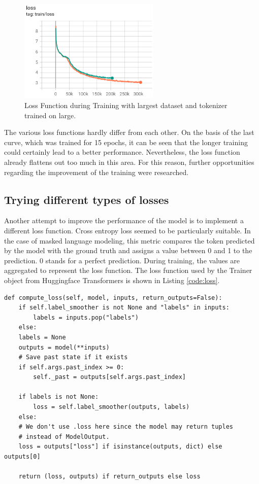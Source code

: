 \begin{figure}[H]
	\centering
	\includegraphics[width=0.6\textwidth]{figures/loss_infs2_large.png}
	\caption{Loss Function during Training with largest dataset and tokenizer trained on large.}
	\label{fig:loss_large_large}
\end{figure}


The various loss functions hardly differ from each other. On the basis of the last curve, which was trained for 15 epochs, it can be seen that the longer training could certainly lead to a better performance. Nevertheless, the loss function already flattens out too much in this area. For this reason, further opportunities regarding the improvement of the training were researched.

\subsection{Trying different types of losses}
Another attempt to improve the performance of the model is to implement a different loss function. Cross entropy loss seemed to be particularly suitable. In the case of masked language modeling, this metric compares the token predicted by the model with the ground truth and assigns a value between 0 and 1 to the prediction. 0 stands for a perfect prediction. During training, the values are aggregated to represent the loss function. \newline
The loss function \cite{loss} used by the Trainer object from Huggingface Transformers is shown in Listing \ref{code:loss}.

\begin{code}
	\label{code:loss}
\begin{verbatim}
def compute_loss(self, model, inputs, return_outputs=False):
	if self.label_smoother is not None and "labels" in inputs:
		labels = inputs.pop("labels")
	else:
	labels = None
	outputs = model(**inputs)
	# Save past state if it exists
	if self.args.past_index >= 0:
		self._past = outputs[self.args.past_index]
	
	if labels is not None:
		loss = self.label_smoother(outputs, labels)
	else:
	# We don't use .loss here since the model may return tuples 
	# instead of ModelOutput.
	loss = outputs["loss"] if isinstance(outputs, dict) else outputs[0]
	
	return (loss, outputs) if return_outputs else loss
\end{verbatim}
\end{code}


